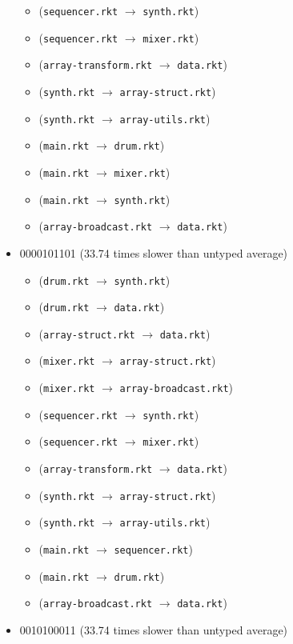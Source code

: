 \documentclass{article}
\newcommand{\mono}[1]{\texttt{#1}}
\begin{document}
\begin{itemize}
\begin{itemize}
  \item (\mono{sequencer.rkt} $\rightarrow$ \mono{synth.rkt})
  \item (\mono{sequencer.rkt} $\rightarrow$ \mono{mixer.rkt})
  \item (\mono{array-transform.rkt} $\rightarrow$ \mono{data.rkt})
  \item (\mono{synth.rkt} $\rightarrow$ \mono{array-struct.rkt})
  \item (\mono{synth.rkt} $\rightarrow$ \mono{array-utils.rkt})
  \item (\mono{main.rkt} $\rightarrow$ \mono{drum.rkt})
  \item (\mono{main.rkt} $\rightarrow$ \mono{mixer.rkt})
  \item (\mono{main.rkt} $\rightarrow$ \mono{synth.rkt})
  \item (\mono{array-broadcast.rkt} $\rightarrow$ \mono{data.rkt})
  \end{itemize}
\item 0000101101 (33.74 times slower than untyped average)
  \begin{itemize}
  \item (\mono{drum.rkt} $\rightarrow$ \mono{synth.rkt})
  \item (\mono{drum.rkt} $\rightarrow$ \mono{data.rkt})
  \item (\mono{array-struct.rkt} $\rightarrow$ \mono{data.rkt})
  \item (\mono{mixer.rkt} $\rightarrow$ \mono{array-struct.rkt})
  \item (\mono{mixer.rkt} $\rightarrow$ \mono{array-broadcast.rkt})
  \item (\mono{sequencer.rkt} $\rightarrow$ \mono{synth.rkt})
  \item (\mono{sequencer.rkt} $\rightarrow$ \mono{mixer.rkt})
  \item (\mono{array-transform.rkt} $\rightarrow$ \mono{data.rkt})
  \item (\mono{synth.rkt} $\rightarrow$ \mono{array-struct.rkt})
  \item (\mono{synth.rkt} $\rightarrow$ \mono{array-utils.rkt})
  \item (\mono{main.rkt} $\rightarrow$ \mono{sequencer.rkt})
  \item (\mono{main.rkt} $\rightarrow$ \mono{drum.rkt})
  \item (\mono{array-broadcast.rkt} $\rightarrow$ \mono{data.rkt})
  \end{itemize}
\item 0010100011 (33.74 times slower than untyped average)

\end{itemize}
\end{document}
